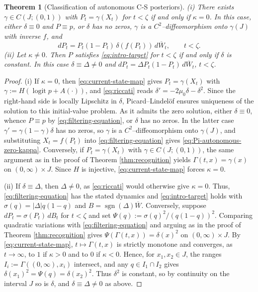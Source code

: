 \documentclass[11pt, reqno]{amsart}
\theoremstyle{plain}
\newtheorem{theorem}{Theorem}[section]
\theoremstyle{remark}
\newcommand{\logit}{\operatorname{logit}}
\numberwithin{equation}{section}
\begin{document}
%

%

%
%
%
%
%
%
%
%
%
%
%
%
%
%
%
%
%
%
%
%
%
%
%
%

%
%
%
%
%

%

%

\begin{theorem}[Classification of autonomous C-S posteriors]\label{thm:classification}
\emph{(i)} There exists $\gamma\in C(J;(0,1))$ with $P_t=\gamma(X_t)$ for $t<\zeta$
if and only if $\kappa=0$. In this case, either $\delta\equiv0$ and $P\equiv p$, or
$\delta$ has no zeros, $\gamma$ is a $C^2$--diffeomorphism onto $\gamma(J)$ with
inverse $f$, and
\begin{equation}\label{eq:Pi-autonomous-zero-kappa}
  dP_t=P_t(1-P_t)\,\delta(f(P_t))\,d\overline W_t,\qquad t<\zeta.
\end{equation}
\emph{(ii)} Let $\kappa\neq0$. Then $P$ satisfies \eqref{eq:intro-target} for
$t<\zeta$ if and only if $\delta$ is constant. In this case $\delta\equiv\Delta\neq0$ and $dP_t=\Delta P_t(1-P_t)\,d\overline W_t$,  $t<\zeta$.
\end{theorem}
\begin{proof}
(i) If $\kappa=0$, then \eqref{eq:current-state-map} gives $P_t=\gamma(X_t)$ with
$\gamma:=H(\logit p+A(\cdot))$, and \eqref{eq:riccati} reads
$\delta'=-2\mu_0\delta-\delta^2$. Since the right-hand side is locally Lipschitz in $\delta$, Picard--Lindel\"of ensures uniqueness of the solution to this initial-value problem. As it admits the zero solution, either $\delta\equiv0$, whence $P\equiv p$ by
\eqref{eq:filtering-equation}, or $\delta$ has no zeros. In the latter case
$\gamma'=\gamma(1-\gamma)\delta$ has no zeros, so $\gamma$ is a
$C^2$--diffeomorphism onto $\gamma(J)$, and substituting $X_t=f(P_t)$ into
\eqref{eq:filtering-equation} gives \eqref{eq:Pi-autonomous-zero-kappa}.
Conversely, if $P_t=\gamma(X_t)$ with $\gamma\in C(J;(0,1))$, the same argument
as in the proof of Theorem \ref{thm:recognition} yields $\Gamma(t,x)=\gamma(x)$ on
$(0,\infty)\times J$. Since $H$ is injective, \eqref{eq:current-state-map} forces
$\kappa=0$.

(ii) If $\delta\equiv\Delta$, then $\Delta\neq0$, as \eqref{eq:riccati} would
otherwise give $\kappa=0$. Thus, \eqref{eq:filtering-equation}
has the stated dynamics and \eqref{eq:intro-target} holds with $\sigma(q)=|\Delta|q(1-q)$ and $B=\operatorname{sgn}(\Delta)\overline W$. Conversely,
suppose $dP_t=\sigma(P_t)\,dB_t$ for $t<\zeta$ and set
$\Psi(q):=\sigma(q)^2/(q(1-q))^2$. Comparing quadratic variations with
\eqref{eq:filtering-equation} and arguing as in the proof of Theorem
\ref{thm:recognition} gives $\Psi(\Gamma(t,x))=\delta(x)^2$ on $(0,\infty)\times J$.
By \eqref{eq:current-state-map}, $t\mapsto\Gamma(t,x)$ is strictly monotone and
converges, as $t\to\infty$, to $1$ if $\kappa>0$ and to $0$ if $\kappa<0$. Hence,
for $x_1,x_2\in J$, the ranges $I_i:=\Gamma((0,\infty),x_i)$ intersect, and any
$q\in I_1\cap I_2$ gives $\delta(x_1)^2=\Psi(q)=\delta(x_2)^2$. Thus $\delta^2$ is
constant, so by continuity on the interval $J$ so is $\delta$, and
$\delta\equiv\Delta\neq0$ as above.
\end{proof}
\end{document}
